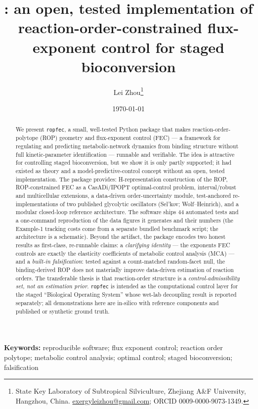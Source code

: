 \documentclass[11pt]{article}
\title{\textbf{\code{ropfec}: an open, tested implementation of
reaction-order-constrained flux-exponent control for staged bioconversion}}
\author{Lei Zhou\thanks{State Key Laboratory of Subtropical Silviculture, Zhejiang
A\&F University, Hangzhou, China. \href{mailto:exergyleizhou@gmail.com}{exergyleizhou@gmail.com};
ORCID 0009-0000-9073-1349.}}
\date{\today}
\newcommand{\code}[1]{\texttt{#1}}
\begin{document}
\maketitle

\begin{abstract}
\noindent
We present \code{ropfec}, a small, well-tested Python package that makes
reaction-order-polytope (ROP) geometry and flux-exponent control (FEC) --- a framework for
regulating and predicting metabolic-network dynamics from binding structure without full
kinetic-parameter identification --- runnable and verifiable. The idea is attractive for
controlling staged bioconversion, but we show it is only partly supported; it had existed as
theory and a model-predictive-control concept without an open, tested implementation. The
package provides:
H-representation construction of the ROP, ROP-constrained FEC as a CasADi/IPOPT
optimal-control problem, interval/robust and multicellular extensions, a data-driven
order-uncertainty module, test-anchored re-implementations of two published glycolytic
oscillators (Sel'kov; Wolf--Heinrich), and a modular closed-loop reference
architecture. The software ships 44 automated tests and a one-command reproduction of the data figures it
generates and their numbers (the Example-1 tracking costs come from a separate bundled
benchmark script; the architecture is a schematic). Beyond the artifact, the package encodes two honest
results as first-class, re-runnable claims: a \emph{clarifying identity} --- the exponents
FEC controls are exactly the elasticity coefficients of metabolic control analysis (MCA)
--- and a \emph{built-in falsification}: tested against a count-matched random-facet null,
the binding-derived ROP does not materially improve data-driven estimation of reaction orders.
The transferable thesis is that reaction-order structure is a \emph{control-admissibility
set, not an estimation prior}. \code{ropfec} is intended as the computational control layer for the
staged ``Biological Operating System'' whose wet-lab decoupling result is reported
separately; all demonstrations here are in-silico with reference components and published
or synthetic ground truth.
\end{abstract}

\noindent\textbf{Keywords:} reproducible software; flux exponent control; reaction order
polytope; metabolic control analysis; optimal control; staged bioconversion; falsification
\end{document}
